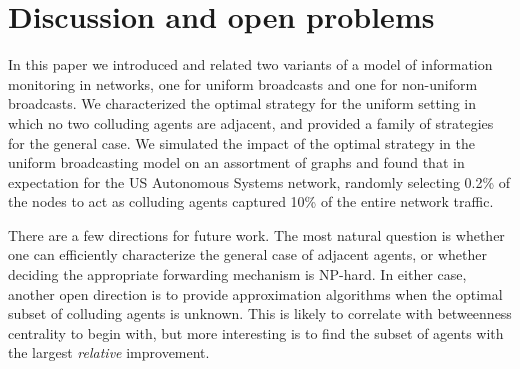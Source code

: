 \documentclass{comnet}
\begin{document}
\section{Discussion and open problems} \label{sec:conclusion}

In this paper we introduced and related two variants of a model of
information monitoring in networks, one for uniform broadcasts and one for
non-uniform broadcasts. We characterized the optimal strategy for the uniform
setting in which no two colluding agents are adjacent, and provided a family of
strategies for the general case. We simulated the impact of the optimal
strategy in the uniform broadcasting model on an assortment of graphs and found
that in expectation for the US Autonomous Systems network, randomly selecting
0.2\% of the nodes to act as colluding agents captured 10\% of the entire
network traffic.  

There are a few directions for future work. The most natural question is
whether one can efficiently characterize the general case of adjacent agents,
or whether deciding the appropriate forwarding mechanism is NP-hard. In either
case, another open direction is to provide approximation algorithms when the
optimal subset of colluding agents is unknown. This is likely to correlate with
betweenness centrality to begin with, but more interesting is to find the
subset of agents with the largest \emph{relative} improvement.





\end{document}
